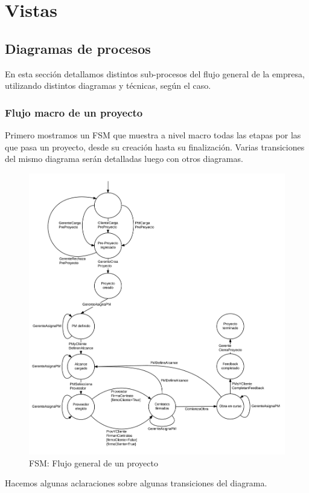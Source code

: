 \section{Vistas}




	\subsection{Diagramas de procesos}

En esta sección detallamos distintos sub-procesos del flujo general de la empresa, 
utilizando distintos diagramas y técnicas, según el caso. 

	\subsubsection{Flujo macro de un proyecto}
Primero mostramos un FSM que muestra a nivel macro todas las etapas por las 
que pasa un proyecto, desde su creación hasta su finalización. Varias transiciones 
del mismo diagrama serán detalladas luego con otros diagramas. 

\begin{figure}[H]
\centering
\includegraphics[width=0.8\linewidth]{diag/nuevos/fsm-proj.png}
\caption{FSM: Flujo general de un proyecto}
\label{fsm-proj}
\end{figure}

Hacemos algunas aclaraciones sobre algunas transiciones del diagrama.\\

